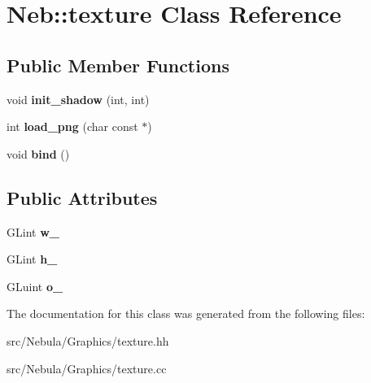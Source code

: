 \hypertarget{classNeb_1_1texture}{\section{Neb\-:\-:texture Class Reference}
\label{classNeb_1_1texture}
}
\subsection*{Public Member Functions}
\begin{DoxyCompactItemize}
\item 
\hypertarget{classNeb_1_1texture_a8d6a7a7332cf05a9ff3509b67a9a3a7d}{void {\bfseries init\-\_\-shadow} (int, int)}\label{classNeb_1_1texture_a8d6a7a7332cf05a9ff3509b67a9a3a7d}

\item 
\hypertarget{classNeb_1_1texture_a39629a65ae9946daf7ed8659feca3ed9}{int {\bfseries load\-\_\-png} (char const $\ast$)}\label{classNeb_1_1texture_a39629a65ae9946daf7ed8659feca3ed9}

\item 
\hypertarget{classNeb_1_1texture_ac5e8baf87aef739ebcc9e4c81e6d1c98}{void {\bfseries bind} ()}\label{classNeb_1_1texture_ac5e8baf87aef739ebcc9e4c81e6d1c98}

\end{DoxyCompactItemize}
\subsection*{Public Attributes}
\begin{DoxyCompactItemize}
\item 
\hypertarget{classNeb_1_1texture_a5906c4fa0e792b2248962d2dd06508d7}{G\-Lint {\bfseries w\-\_\-}}\label{classNeb_1_1texture_a5906c4fa0e792b2248962d2dd06508d7}

\item 
\hypertarget{classNeb_1_1texture_ad7caf7e0f403d4e13fde5bd19761dd8a}{G\-Lint {\bfseries h\-\_\-}}\label{classNeb_1_1texture_ad7caf7e0f403d4e13fde5bd19761dd8a}

\item 
\hypertarget{classNeb_1_1texture_a200e3dfdfa5616cba3ef97b63cbe3a54}{G\-Luint {\bfseries o\-\_\-}}\label{classNeb_1_1texture_a200e3dfdfa5616cba3ef97b63cbe3a54}

\end{DoxyCompactItemize}


The documentation for this class was generated from the following files\-:\begin{DoxyCompactItemize}
\item 
src/\-Nebula/\-Graphics/texture.\-hh\item 
src/\-Nebula/\-Graphics/texture.\-cc\end{DoxyCompactItemize}
